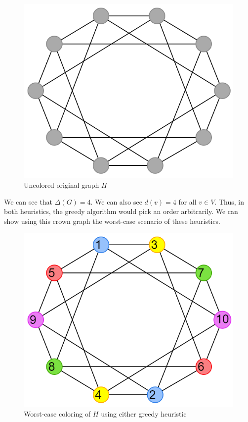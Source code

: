 \documentclass{article}
\begin{document}
\begin{figure}[H]
\centering
\includegraphics[scale=0.38]{images/graph-4.png}
\caption{Uncolored original graph \(H\)}
\end{figure}

We can see that \(\Delta(G) = 4\). We can also see \(d(v) = 4\) for all \(v \in V\). Thus, in both heuristics, the greedy algorithm would pick an order arbitrarily. We can show using this crown graph the worst-case scenario of these heuristics.

\begin{figure}[H]
\centering
\includegraphics[scale=0.38]{images/graph-5.png}
\caption{Worst-case coloring of \(H\) using either greedy heuristic}
\end{figure}
\end{document}
